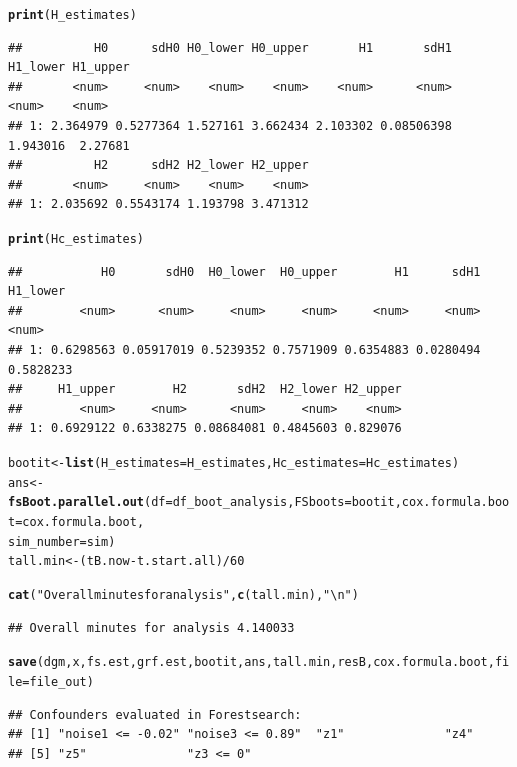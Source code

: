 \documentclass[12pt]{article}
\makeatletter
\newcommand{\hlnum}[1]{\textcolor[rgb]{0.686,0.059,0.569}{#1}}%
\newcommand{\hlstr}[1]{\textcolor[rgb]{0.192,0.494,0.8}{#1}}%
\newcommand{\hlopt}[1]{\textcolor[rgb]{0,0,0}{#1}}%
\newcommand{\hlstd}[1]{\textcolor[rgb]{0.345,0.345,0.345}{#1}}%
\newcommand{\hlkwb}[1]{\textcolor[rgb]{0.69,0.353,0.396}{#1}}%
\newcommand{\hlkwc}[1]{\textcolor[rgb]{0.333,0.667,0.333}{#1}}%
\newcommand{\hlkwd}[1]{\textcolor[rgb]{0.737,0.353,0.396}{\textbf{#1}}}%
\newenvironment{kframe}{%
 \def\at@end@of@kframe{}%
 \ifinner\ifhmode%
  \def\at@end@of@kframe{\end{minipage}}%
  \begin{minipage}{\columnwidth}%
 \fi\fi%
 \def\FrameCommand##1{\hskip\@totalleftmargin \hskip-\fboxsep
 \colorbox{shadecolor}{##1}\hskip-\fboxsep
     \hskip-\linewidth \hskip-\@totalleftmargin \hskip\columnwidth}%
 \MakeFramed {\advance\hsize-\width
   \@totalleftmargin\z@ \linewidth\hsize
   \@setminipage}}%
 {\par\unskip\endMakeFramed%
 \at@end@of@kframe}
\newenvironment{knitrout}{}{} %
\makeatother
\begin{document}
\begin{knitrout}
\begin{kframe}
\begin{alltt}
\hlkwd{print}\hlstd{(H_estimates)}
\end{alltt}
\begin{verbatim}
##          H0      sdH0 H0_lower H0_upper       H1       sdH1 H1_lower H1_upper
##       <num>     <num>    <num>    <num>    <num>      <num>    <num>    <num>
## 1: 2.364979 0.5277364 1.527161 3.662434 2.103302 0.08506398 1.943016  2.27681
##          H2      sdH2 H2_lower H2_upper
##       <num>     <num>    <num>    <num>
## 1: 2.035692 0.5543174 1.193798 3.471312
\end{verbatim}
\begin{alltt}
\hlkwd{print}\hlstd{(Hc_estimates)}
\end{alltt}
\begin{verbatim}
##           H0       sdH0  H0_lower  H0_upper        H1      sdH1  H1_lower
##        <num>      <num>     <num>     <num>     <num>     <num>     <num>
## 1: 0.6298563 0.05917019 0.5239352 0.7571909 0.6354883 0.0280494 0.5828233
##     H1_upper        H2       sdH2  H2_lower H2_upper
##        <num>     <num>      <num>     <num>    <num>
## 1: 0.6929122 0.6338275 0.08684081 0.4845603 0.829076
\end{verbatim}
\begin{alltt}
\hlstd{bootit} \hlkwb{<-} \hlkwd{list}\hlstd{(}\hlkwc{H_estimates} \hlstd{= H_estimates,} \hlkwc{Hc_estimates} \hlstd{= Hc_estimates)}
\hlstd{ans} \hlkwb{<-} \hlkwd{fsBoot.parallel.out}\hlstd{(}\hlkwc{df} \hlstd{= df_boot_analysis,} \hlkwc{FSboots} \hlstd{= bootit,} \hlkwc{cox.formula.boot} \hlstd{= cox.formula.boot,}
    \hlkwc{sim_number} \hlstd{= sim)}
\hlstd{tall.min} \hlkwb{<-} \hlstd{(tB.now} \hlopt{-} \hlstd{t.start.all)}\hlopt{/}\hlnum{60}

\hlkwd{cat}\hlstd{(}\hlstr{"Overall minutes for analysis"}\hlstd{,} \hlkwd{c}\hlstd{(tall.min),} \hlstr{"\textbackslash{}n"}\hlstd{)}
\end{alltt}
\begin{verbatim}
## Overall minutes for analysis 4.140033
\end{verbatim}
\begin{alltt}
\hlkwd{save}\hlstd{(dgm, x, fs.est, grf.est, bootit, ans, tall.min, resB, cox.formula.boot,} \hlkwc{file} \hlstd{= file_out)}
\end{alltt}
\end{kframe}
\end{knitrout}


\begin{knitrout}
\color{fgcolor}\begin{kframe}
\begin{verbatim}
## Confounders evaluated in Forestsearch:
## [1] "noise1 <= -0.02" "noise3 <= 0.89"  "z1"              "z4"             
## [5] "z5"              "z3 <= 0"
\end{verbatim}
\end{kframe}
\end{knitrout}
\end{document}
